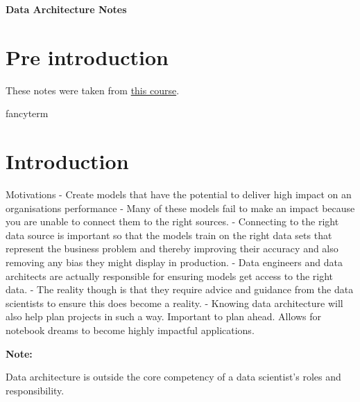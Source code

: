 \documentclass[a4paper, 11pt]{article}
\newenvironment{note}{
    \begin{siderule}
        \textbf{Note: }
        }{
    \end{siderule}}
\begin{document}
    \begin{titlepage}
        \centering
        \vspace*{2in}
        \Huge \textbf{Data Architecture Notes}
    \end{titlepage}

    \setcounter{section}{0}

    \newpage

    \tableofcontents
    \newpage

    \listoffigures
    \newpage


    \section{Pre introduction}
    These notes were taken from \href{https://www.udemy.com/course/data-architecture-for-data-scientists}{this course}.


    \gls{fancyterm}


    \section{Introduction}
    Motivations
    - Create models that have the potential to deliver high impact on an organisations performance
    - Many of these models fail to make an impact because you are unable to connect them to the right sources.
    - Connecting to the right data source is important so that the models train on the right data sets that represent the business problem and thereby improving their accuracy and also removing any bias they might display in production.
    - Data engineers and data architects are actually responsible for ensuring models get access to the right data.
    - The reality though is that they require advice and guidance from the data scientists to ensure this does become a reality.
    - Knowing data architecture will also help plan projects in such a way.
    Important to plan ahead.
    Allows for notebook dreams to become highly impactful applications.

    \begin{note}
        Data architecture is outside the core competency of a data scientist’s roles and responsibility.
    \end{note}
\end{document}
